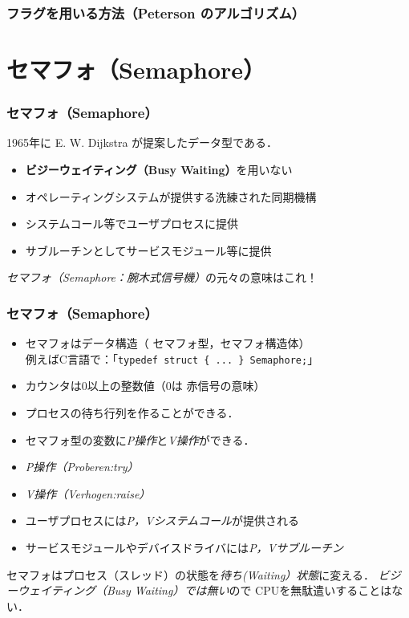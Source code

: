\documentclass[unicode,handout]{beamer}                   %
\begin{document}
\begin{frame}
  \frametitle{フラグを用いる方法（Peterson のアルゴリズム）}
  \vfill
\end{frame}

\section{セマフォ（Semaphore）}
\begin{frame}
  \frametitle{セマフォ（Semaphore）}
  1965年に E. W. Dijkstra が提案したデータ型である．
  \begin{itemize}
  \item {\bf ビジーウェイティング（Busy Waiting）}を用いない
  \item オペレーティングシステムが提供する洗練された同期機構
  \item システムコール等でユーザプロセスに提供
  \item サブルーチンとしてサービスモジュール等に提供
  \end{itemize}
  \vfill
  \emph{セマフォ（Semaphore：腕木式信号機）}の元々の意味はこれ！ \\
  \vfill
\end{frame}

\begin{frame}
  \frametitle{セマフォ（Semaphore）}
  \begin{itemize}
  \item セマフォはデータ構造（{\color{red} セマフォ型}，セマフォ構造体）\\
    例えばC言語で：「\texttt{typedef struct \{ ... \} Semaphore;}」
  \item カウンタは0以上の整数値（0は{\color{red} 赤信号}の意味）
  \item プロセスの待ち行列を作ることができる．
  \item セマフォ型の変数に\emph{P操作}と\emph{V操作}ができる．
  \item \emph{P操作（{\it Proberen}:try）}
  \item \emph{V操作（{\it Verhogen}:raise）}
  \item ユーザプロセスには\emph{P，Vシステムコール}が提供される
  \item サービスモジュールやデバイスドライバには\emph{P，Vサブルーチン}
  \end{itemize}
  \vfill
  セマフォはプロセス（スレッド）の状態を\emph{待ち(Waiting）状態}に変える．
    \emph{ビジーウェイティング（Busy Waiting）では無い}ので
    CPUを無駄遣いすることはない．
\end{frame}
\end{document}
